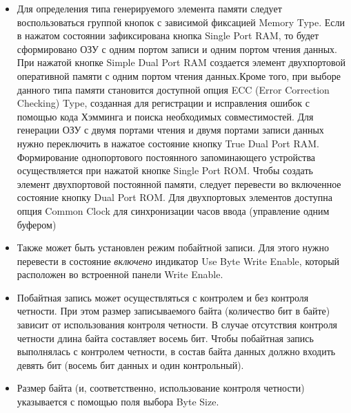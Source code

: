 \begin{itemize}
\item Для определения типа генерируемого элемента памяти следует воспользоваться группой кнопок с зависимой фиксацией Memory Type. Если в нажатом состоянии зафиксирована кнопка Single Port RAM, то будет сформировано ОЗУ с одним портом записи и одним портом чтения данных. При нажатой кнопке Simple Dual Port RAM создается элемент двухпортовой оперативной памяти с одним портом чтения данных.Кроме того, при выборе данного типа памяти становится доступной опция ECC (Error Correction Checking) Type, созданная для регистрации и исправления ошибок с помощью кода Хэмминга и поиска необходимых совместимостей. Для генерации ОЗУ с двумя портами чтения и двумя портами записи данных нужно переключить в нажатое состояние кнопку True Dual Port RAM. Формирование однопортового постоянного запоминающего устройства осуществляется при нажатой кнопке Single Port ROM. Чтобы создать элемент двухпортовой постоянной памяти, следует перевести во включенное состояние кнопку Dual Port ROM. Для двухпортовых элементов доступна опция Common Clock для синхронизации часов ввода (управление одним буфером)
\item Также может быть установлен режим побайтной записи. Для этого нужно перевести в состояние \emph {включено} индикатор Use Byte Write Enable, который расположен во встроенной панели Write Enable.
\item Побайтная запись может осуществляться с контролем и без контроля четности. При этом размер записываемого байта (количество бит в байте) зависит от использования контроля четности. В случае отсутствия контроля четности длина байта составляет восемь бит. Чтобы побайтная запись выполнялась с контролем четности, в состав байта данных должно входить девять бит (восемь бит данных и один контрольный). 
\item Размер байта (и, соответственно, использование контроля четности) указывается с помощью поля выбора Byte Size.

\end{itemize}
